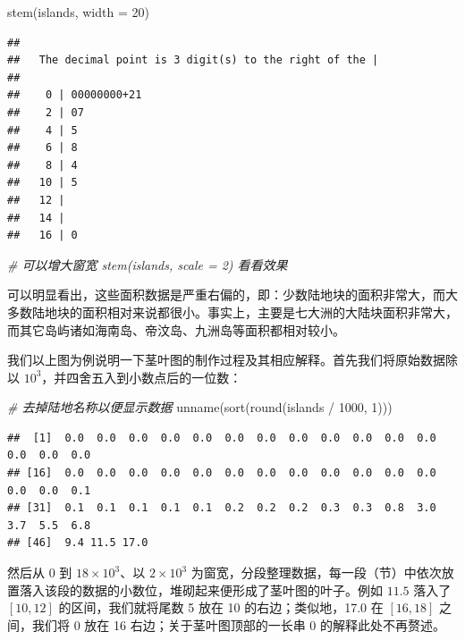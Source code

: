 \documentclass[
  b5paper,
  UTF8,twoside]{book}
\newenvironment{Shaded}{\begin{snugshade}}{\end{snugshade}}
\newcommand{\AttributeTok}[1]{\textcolor[rgb]{0.77,0.63,0.00}{#1}}
\newcommand{\CommentTok}[1]{\textcolor[rgb]{0.56,0.35,0.01}{\textit{#1}}}
\newcommand{\DecValTok}[1]{\textcolor[rgb]{0.00,0.00,0.81}{#1}}
\newcommand{\FunctionTok}[1]{\textcolor[rgb]{0.00,0.00,0.00}{#1}}
\newcommand{\NormalTok}[1]{#1}
\newcommand{\SpecialCharTok}[1]{\textcolor[rgb]{0.00,0.00,0.00}{#1}}
\begin{document}
\begin{Shaded}
\begin{Highlighting}[]
\FunctionTok{stem}\NormalTok{(islands, }\AttributeTok{width =} \DecValTok{20}\NormalTok{)}
\end{Highlighting}
\end{Shaded}

\begin{verbatim}
## 
##   The decimal point is 3 digit(s) to the right of the |
## 
##    0 | 00000000+21
##    2 | 07
##    4 | 5
##    6 | 8
##    8 | 4
##   10 | 5
##   12 | 
##   14 | 
##   16 | 0
\end{verbatim}

\begin{Shaded}
\begin{Highlighting}[]
\CommentTok{\# 可以增大窗宽 stem(islands, scale = 2) 看看效果}
\end{Highlighting}
\end{Shaded}

可以明显看出，这些面积数据是严重右偏的，即：少数陆地块的面积非常大，而大多数陆地块的面积相对来说都很小。事实上，主要是七大洲的大陆块面积非常大，而其它岛屿诸如海南岛、帝汶岛、九洲岛等面积都相对较小。

我们以上图为例说明一下茎叶图的制作过程及其相应解释。首先我们将原始数据除以 \(10^{3}\)，并四舍五入到小数点后的一位数：

\begin{Shaded}
\begin{Highlighting}[]
\CommentTok{\# 去掉陆地名称以便显示数据}
\FunctionTok{unname}\NormalTok{(}\FunctionTok{sort}\NormalTok{(}\FunctionTok{round}\NormalTok{(islands }\SpecialCharTok{/} \DecValTok{1000}\NormalTok{, }\DecValTok{1}\NormalTok{)))}
\end{Highlighting}
\end{Shaded}

\begin{verbatim}
##  [1]  0.0  0.0  0.0  0.0  0.0  0.0  0.0  0.0  0.0  0.0  0.0  0.0  0.0  0.0  0.0
## [16]  0.0  0.0  0.0  0.0  0.0  0.0  0.0  0.0  0.0  0.0  0.0  0.0  0.0  0.0  0.1
## [31]  0.1  0.1  0.1  0.1  0.1  0.2  0.2  0.2  0.3  0.3  0.8  3.0  3.7  5.5  6.8
## [46]  9.4 11.5 17.0
\end{verbatim}

然后从 0 到 \(18\times10^{3}\)、以 \(2\times10^{3}\) 为窗宽，分段整理数据，每一段（节）中依次放置落入该段的数据的小数位，堆砌起来便形成了茎叶图的叶子。例如 \(11.5\) 落入了 \([10,12]\) 的区间，我们就将尾数 5 放在 10 的右边；类似地，17.0 在 \([16,18]\) 之间，我们将 0 放在 16 右边；关于茎叶图顶部的一长串 0 的解释此处不再赘述。
\end{document}

